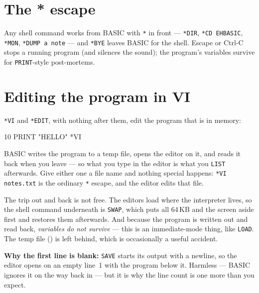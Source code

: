 
\section{The * escape}
Any shell command works from BASIC with \verb|*| in front --- \verb|*DIR|,
\verb|*CD EHBASIC|, \verb|*MON|, \verb|*DUMP a note| --- and \verb|*BYE|
leaves BASIC for the shell. Escape or Ctrl-C stops a running program (and
silences the sound); the program's variables survive for
\verb|PRINT|-style post-mortems.

\section{Editing the program in VI}\label{sec:basicvi}
\verb|*VI| and \verb|*EDIT|, with nothing after them, edit the program that
is in memory:

\begin{type}
10 PRINT "HELLO"
*VI
\end{type}

\noindent BASIC writes the program to a temp file, opens the editor on it,
and reads it back when you leave --- so what you type in the editor is what
you \verb|LIST| afterwards. Give either one a file name and nothing special
happens: \verb|*VI notes.txt| is the ordinary \verb|*| escape, and the
editor edits that file.

The trip out and back is not free. The editors load where the interpreter
lives, so the shell command underneath is \verb|SWAP|, which puts all
64\,KB and the screen aside first and restores them afterwards. And because
the program is written out and read back, \emph{variables do not survive} ---
this is an immediate-mode thing, like \verb|LOAD|. The temp file
() is left behind, which is occasionally a useful accident.

\begin{aside}
\textbf{Why the first line is blank:} \verb|SAVE| starts its output with a
newline, so the editor opens on an empty line~1 with the program below it.
Harmless --- BASIC ignores it on the way back in --- but it is why the line
count is one more than you expect.
\end{aside}

